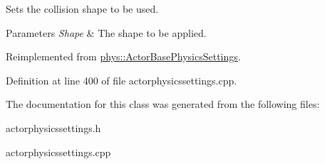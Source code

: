 Sets the collision shape to be used. 


\begin{DoxyParams}{Parameters}
{\em Shape} & The shape to be applied. \\
\hline
\end{DoxyParams}


Reimplemented from \hyperlink{classphys_1_1ActorBasePhysicsSettings_a1509c654724bcb6499ec1e5058ab5185}{phys::ActorBasePhysicsSettings}.



Definition at line 400 of file actorphysicssettings.cpp.



The documentation for this class was generated from the following files:\begin{DoxyCompactItemize}
\item 
actorphysicssettings.h\item 
actorphysicssettings.cpp\end{DoxyCompactItemize}
